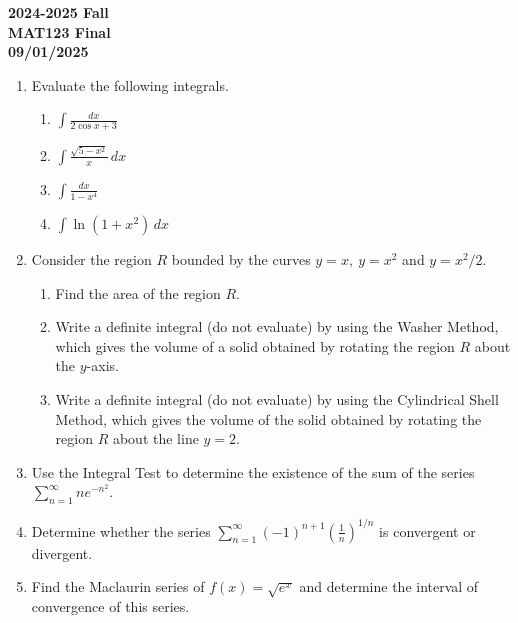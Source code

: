 \documentclass[a4paper, 12pt]{article}
\begin{document}
\newpage
{}
{}
\begin{center}
\textbf{2024-2025 Fall\\MAT123 Final\\09/01/2025}
\end{center}

\begin{enumerate}[leftmargin=*,label=\textbf{\arabic*.}]
\item Evaluate the following integrals.

\begin{enumerate}[leftmargin=*,label=\textbf{\alph*.}]
\item $\displaystyle\int\frac{dx}{2\cos x+3}$
\item $\displaystyle\int\frac{\sqrt{5-x^2}}{x}\,dx$
\item $\displaystyle\int\frac{dx}{1-x^4}$
\item $\displaystyle\int\ln\left(1+x^2\right)\,dx$
\end{enumerate}

\item Consider the region $R$ bounded by the curves $y=x,\:y=x^2$ and $y=x^2/2$.
\begin{enumerate}[leftmargin=*,label=\textbf{\alph*.}]
\item Find the area of the region $R$.
\item Write a definite integral (do not evaluate) by using the Washer Method, which gives the volume of a solid obtained by rotating the region $R$ about the $y$-axis.
\item Write a definite integral (do not evaluate) by using the Cylindrical Shell Method, which gives the volume of the solid obtained by rotating the region $R$ about the line $y=2$.
\end{enumerate}

\item Use the Integral Test to determine the existence of the sum of the series $\displaystyle\sum_{n=1}^\infty n e^{-n^2}$.

\item Determine whether the series $\displaystyle\sum_{n=1}^\infty(-1)^{n+1}\left(\frac1n\right)^{1/n}$ is convergent or divergent.

\item Find the Maclaurin series of $f(x)=\sqrt{ e^x}$ and determine the interval of convergence of this series.
\end{enumerate}
\end{document}

